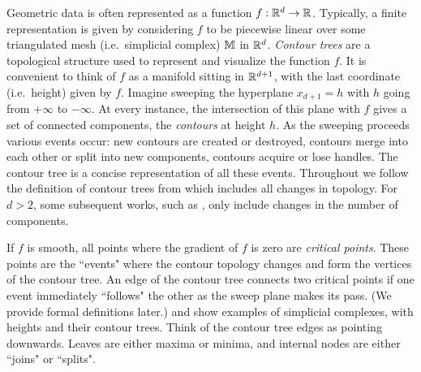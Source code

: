 Geometric data is often represented as a function $f: \mathbb{R}^d \to \mathbb{R}$. Typically, a finite representation is given
by considering $f$ to be piecewise linear over some triangulated mesh (i.e.\ simplicial complex) $\mathbb{M}$ in $\mathbb{R}^d$.
\emph{Contour trees} are a topological structure used to represent and visualize
the function $f$. 
% 
It is convenient to think of $f$ as a manifold sitting in $\mathbb{R}^{d+1}$,
with the last coordinate (i.e.\ height) given by $f$. Imagine sweeping the hyperplane $x_{d+1} = h$
with $h$ going from $+\infty$ to $-\infty$. At every instance, the intersection of this plane 
with $f$ gives a set of connected components, the \emph{contours} at height $h$. As the sweeping 
proceeds various events occur: new contours are created or destroyed, contours merge into each other or
split into new components, contours acquire or lose handles. 
The contour tree is a concise representation of all these events.
Throughout we follow the definition of contour trees from \cite{kobps-ctsssit-97} which includes all changes in topology.  
For $d>2$, some subsequent works, such as \cite{csa-cctad-00}, only include changes in the number of components.

If $f$ is smooth, all points where the gradient of $f$ is zero are \emph{critical points}.
These points are the ``events" where the contour topology changes and form the vertices of the contour tree. 
An edge of the contour tree connects two critical points if one event immediately ``follows"
the other as the sweep plane makes its pass. (We provide formal definitions later.) 
 and  
show examples of simplicial complexes, with heights and their contour trees.
Think of the contour tree edges as pointing downwards. Leaves are either maxima or minima,
and internal nodes are either ``joins" or ``splits".


